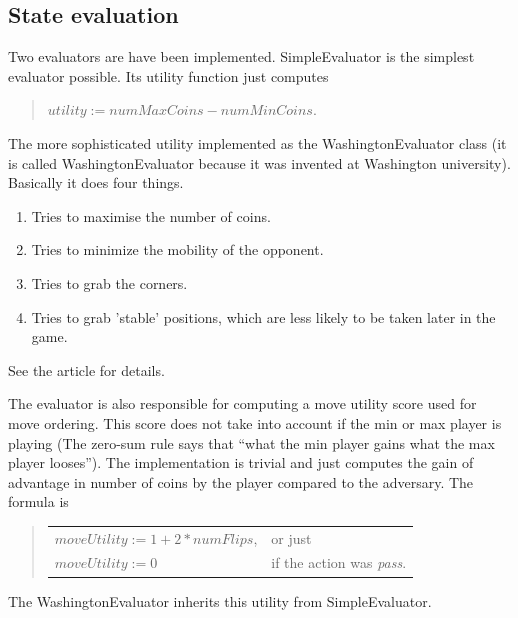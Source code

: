 \documentclass[a4paper,11pt]{article}
\begin{document}
\subsection{State evaluation}
Two evaluators are have been implemented. SimpleEvaluator is the simplest evaluator possible. Its utility function just computes
\begin{quotation}
$utility :=  numMaxCoins - numMinCoins$. 
\end{quotation}
The more sophisticated utility implemented as the WashingtonEvaluator class (it is called WashingtonEvaluator because it was invented at Washington university). Basically it does four things.
\begin{enumerate}
\item Tries to maximise the number of coins.
\item Tries to minimize the mobility of the opponent.
\item Tries to grab the corners.
\item Tries to grab 'stable' positions, which are less likely to be taken later in the game.
\end{enumerate}
See the article\cite{utility} for details.

The evaluator is also responsible for computing a move utility score used for move ordering. This score does not take into account if the min or max player is playing (The zero-sum rule says that ``what the min player gains what the max player looses''). The implementation is trivial and just computes the gain of advantage in number of coins by the player compared to the adversary. The formula is
\begin{quotation}
\begin{tabular}{l l}
$moveUtility := 1 + 2*numFlips$, & or just \\

$moveUtility := 0$ & if the action was \textit{pass}.
\end{tabular}
\end{quotation}
The WashingtonEvaluator inherits this utility from SimpleEvaluator.

%
%	
%
%		
%	
%
%	
%	
%	
\end{document}
